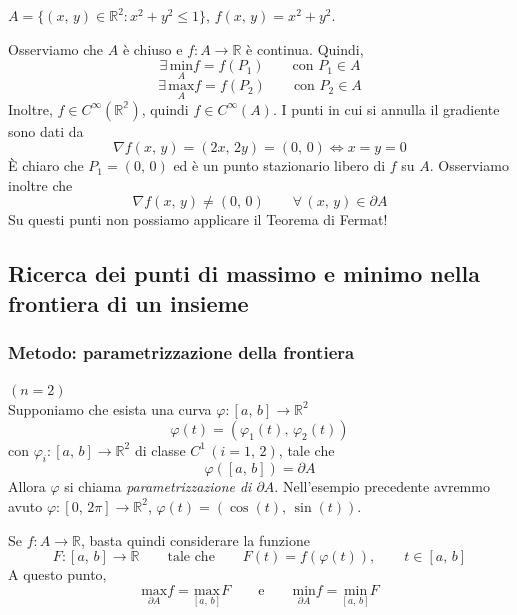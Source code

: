 \begin{example}
$A = \lbrace (x,\,y) \in \mathbb{R}^2 : x^2 + y^2 \leq 1 \rbrace$, $f(x,\,y) = x^2 + y^2$.
\begin{center}
\def\svgwidth{6cm}

\end{center}
Osserviamo che $A$ è chiuso e $f : A \longrightarrow \mathbb{R}$ è continua. Quindi,
$$
\exists \, \underset{A}{\mathrm{min}}f = f(P_1) \qquad \text{con } P_1 \in A
$$
$$
\exists \, \underset{A}{\mathrm{max}}f = f(P_2) \qquad \text{con } P_2 \in A
$$
Inoltre, $f \in C^{\infty}(\mathbb{R^2})$, quindi $f \in C^{\infty}(A)$. I punti in cui si annulla il gradiente sono dati da
$$
\nabla f(x,\,y) = (2x,\,2y) = (0,\,0) \Longleftrightarrow x = y = 0
$$
\`E chiaro che $P_1 = (0,\,0)$ ed è un punto stazionario libero di $f$ su $A$. Osserviamo inoltre che
$$
\nabla f(x,\,y) \neq (0,\,0) \qquad \forall \, (x,\,y) \in \partial A
$$
Su questi punti non possiamo applicare il Teorema di Fermat!
\end{example}


\subsection{Ricerca dei punti di massimo e minimo nella frontiera di un insieme}

\subsubsection{ Metodo: parametrizzazione della frontiera}
\underline{$(n = 2)$}\\
Supponiamo che esista una curva $\varphi : [a,\,b] \longrightarrow \mathbb{R}^2$
$$
\varphi (t) = \left( \varphi_1(t),\,\varphi_2(t) \right)
$$
con $\varphi_i : [a,\,b] \longrightarrow \mathbb{R}^2$ di classe $C^1 \, (i = 1,\,2)$, tale che
$$
\varphi ([a,\,b]) = \partial A
$$
Allora $\varphi$ si chiama \emph{parametrizzazione di $\partial A$}. Nell'esempio precedente avremmo avuto $\varphi : [0,\,2\pi] \longrightarrow \mathbb{R}^2$, $\varphi (t) = \left( \cos(t),\, \sin(t) \right)$.

Se $f : A \longrightarrow \mathbb{R}$, basta quindi considerare la funzione
$$
F : [a,\,b] \longrightarrow \mathbb{R} \qquad \text{tale che} \qquad F(t) = f(\varphi(t)), \qquad t \in [a,\,b]
$$
A questo punto,
$$
\underset{\partial A}{\mathrm{max}}f = \underset{[a,\,b]}{\mathrm{max}}F
\qquad \text{e} \qquad
\underset{\partial A}{\mathrm{min}}f = \underset{[a,\,b]}{\mathrm{min}}F
$$

